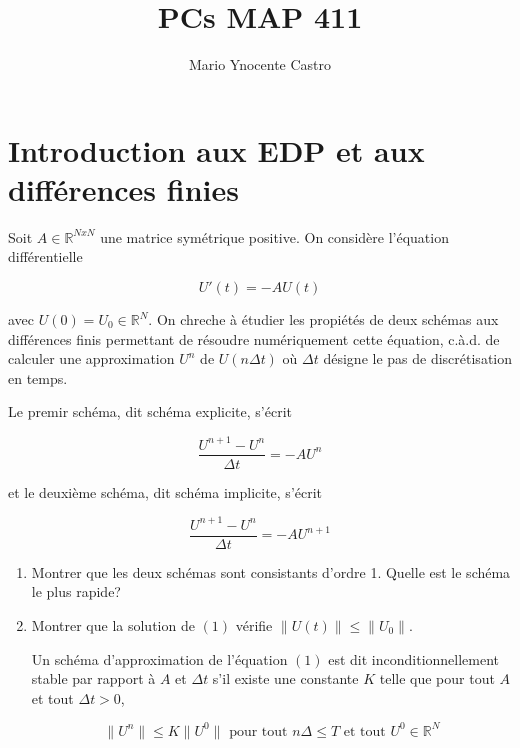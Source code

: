 \documentclass[10pt,a4paper,oneside]{article}
\newenvironment{exercice}[1][Exercice]{\begin{trivlist}
\item[\hskip \labelsep {\bfseries #1}]}{\end{trivlist}}
\begin{document}
\title{PCs MAP 411}
\author{Mario Ynocente Castro}

\maketitle

\section{Introduction aux EDP et aux différences finies}

\begin{exercice}{1}

Soit $A \in \mathbb{R}^{N x N}$ une matrice symétrique positive. On considère l'équation différentielle

\begin{equation}
U'(t) = -AU(t)
\end{equation}

avec $U(0) = U_0 \in \mathbb{R}^N$. On chreche à étudier les propiétés de deux schémas aux différences finis permettant de résoudre numériquement cette équation, c.à.d. de calculer une approximation $U^n$ de $U(n \Delta t)$ où $\Delta t$ désigne le pas de discrétisation en temps.

Le premir schéma, dit schéma explicite, s'écrit

\begin{equation}
\frac{U^{n + 1} - U^n}{\Delta t} = -A U^n
\end{equation}

et le deuxième schéma, dit schéma implicite, s'écrit

\begin{equation}
\frac{U^{n + 1} - U^n}{\Delta t} = -A U^{n + 1}
\end{equation}

\begin{enumerate}
\item
Montrer que les deux schémas sont consistants d'ordre 1. Quelle est le schéma le plus rapide?

\item
Montrer que la solution de $(1)$ vérifie $\| U(t) \| \leq \| U_0 \|$.

Un schéma d'approximation de l'équation $(1)$ est dit inconditionnellement stable par rapport à $A$ et $\Delta t$ s'il existe une constante $K$ telle que pour tout $A$ et tout $\Delta t > 0$,

\begin{equation}
\| U^n \| \leq K \| U^0 \| \text{ pour tout } n\Delta \leq T \text{ et tout } U^0 \in \mathbb{R}^N
\end{equation}


\end{enumerate}
\end{exercice}
\end{document}
